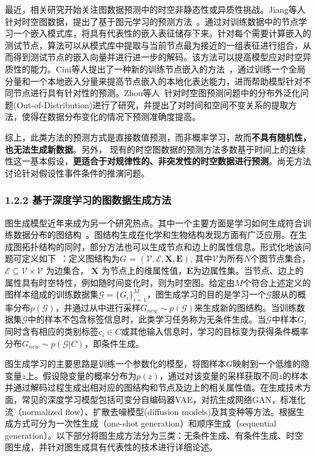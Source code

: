 最近，相关研究开始关注图数据预测中的时空非静态性或异质性挑战。Jiang等人针对时空图数据，提出了基于图元学习的预测方法~\cite{jiang2023spatio}。通过对训练数据中的节点学习一个嵌入模式库，将具有代表性的嵌入表征储存下来。针对每个需要计算嵌入的测试节点，算法可以从模式库中提取与当前节点最为接近的一组表征进行组合，从而得到测试节点的嵌入向量并进行进一步的解码。该方法可以提高模型应对时空异质性的能力。Cini等人提出了一种新的训练节点嵌入的方法~\cite{cini2023taming}，通过训练一个全局分量和一个本地嵌入分量来提高节点嵌入的本地化表达能力，进而帮助模型针对不同节点进行具有针对性的预测。Zhou等人~\cite{zhou2023maintaining}针对时空图预测问题中的分布外泛化问题(Out-of-Distribution)进行了研究，并提出了对时间和空间不变关系的提取方法，使得在数据分布变化的情况下预测准确度提高。

综上，此类方法的预测方式是直接数值预测，而非概率学习，故而\textbf{不具有随机性，也无法生成新数据}。另外，
现有的时空图数据的预测方法多数基于时间上的连续性这一基本假设，\textbf{更适合于对规律性的、非突发性的时空数据进行预测}。尚无方法讨论针对假设性事件条件的推演问题。

\subsubsection{1.2.2 基于深度学习的图数据生成方法}
图生成模型近年来成为另一个研究热点。其中一个主要方面是学习如何生成符合训练数据分布的图结构~\cite{guo2022systematic,zhu2022survey,li2018learning}。图结构生成在化学和生物结构发现方面有广泛应用。在生成图拓扑结构的同时，部分方法也可以生成节点和边上的属性信息。形式化地该问题可定义如下~\cite{zhu2022survey}：定义图结构为${G}$ = $\mathcal{(V, E, \mathbf{X}, \mathbf{E})}$, 其中$\mathcal{V}$为所有$N$个图节点集合，$\mathcal{E} \subseteq \mathcal{V}\times \mathcal{V}$ 为边集合，%
$\mathbf{X}$ %
为节点上的维属性值，$\mathbf{E}%
$为边属性集。当节点、边上的属性具有时空特性，例如随时间变化时，则为时空图。给定由$M$个符合上述定义的图样本组成的训练数据集$\mathcal{G} = \{G_i\}_{i=1}^M$，图生成学习的目的是学习一个$\mathcal{G}$服从的概率分布$p(\mathcal{G})$，并通过从中进行采样$G_{new}\sim p(\mathcal{G})$来生成新的图结构。当训练数据集$\mathcal{G}$中的样本不包含标签信息时，此类学习任务称为无条件生成。当$\mathcal{G}$中样本$G_i$同时含有相应的类别标签$c_i\in C$或其他输入信息时，学习的目标变为获得条件概率分布$G_{new}\sim p(\mathcal{G}|C)$，即条件生成。

图生成学习的主要思路是训练一个参数化的模型，将图样本$G$映射到一个低维的隐变量$z$上。假设隐变量的概率分布为$p(z)$，通过对该变量的采样获取不同$z$的样本并通过解码过程生成出相对应的图结构和节点及边上的相关属性值。在生成技术方面，常见的深度学习模型包括可变分自编码器VAE，对抗生成网络GAN，标准化流（normalized flow）、扩散去噪模型(diffusion models)及其变种等方法。根据生成方式可分为一次性生成（one-shot generation）和顺序生成（sequential generation）。以下部分将图生成方法分为三类：无条件生成、有条件生成、时空图生成，并针对图生成具有代表性的技术进行详细论述。

